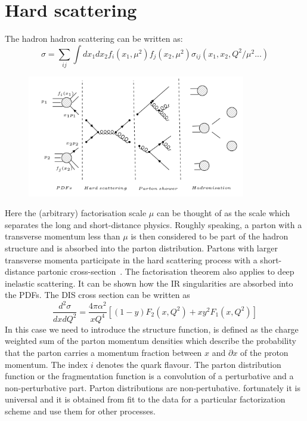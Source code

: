 \section{Hard scattering}
The hadron hadron scattering can be written as:
\begin{equation}
\sigma = \sum_{ij} \int dx_1 dx_2 f_i(x_1, \mu^2)f_j(x_2, \mu^2) \sigma_{ij}(x_1, x_2, Q^2/\mu^2... )
\end{equation}
\begin{figure}[h!]
\centering
\includegraphics[width=0.85\textwidth]{images/Intro/Hard.png}
\end{figure}
Here the (arbitrary) factorisation scale $ \mu $ can be thought of
as the scale which separates the long and short-distance physics.
Roughly speaking, a parton with a transverse momentum less
than $ \mu $ is then considered to be part of the hadron structure and
is absorbed into the parton distribution. Partons with larger transverse momenta participate in the hard scattering process with a short-distance partonic cross-section~\cite{Nagy:2006kb}.
The factorisation theorem also applies to deep inelastic scattering. It can be shown how the IR singularities are absorbed into the PDFs. The DIS cross section can be written as ~\cite{Ellis:1991qj}
\begin{equation}
\frac{d^2 \sigma}{dx dQ^2}=\frac{4\pi \alpha^2}{x Q^4}[(1-y)F_2 (x, Q^2)+xy^2 F_1(x, Q^2)]
\end{equation}
In this case we need to introduce the structure function, is defined as the charge weighted sum of the parton momentum densities which describe the probability that the parton carries a momentum
fraction between $ x $ and $ \partial x $ of the proton momentum. The index $i$ denotes the quark flavour. The parton distribution function or the fragmentation function is a convolution of a perturbative and a non-perturbative part. Parton distributions are non-pertubative. fortunately it is universal and it is obtained from fit to the data for a particular factorization scheme and use them for other processes.

